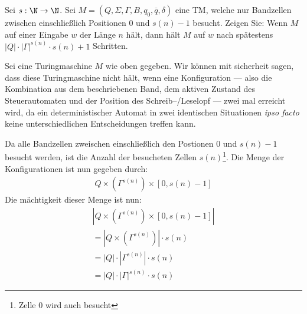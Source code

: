 \documentclass[listings, a4paper, 11pt]{homeworkassignment}
\date{\today}
\author{
  Georg Dorndorf\\
  Adrian Hinrichs}
\newcommand{\task}[1]{
  \begin{framed}
    \keyword{Problem:} #1
  \end{framed}
}
\newcommand*\card[1]{\left|#1\right|}
\begin{document}
\maketitle
\makeGradingTable[14]

\task{Sei \(s: \N \rightarrow \N\). Sei \(M= (Q,Σ,Γ,B,q_0,\overline{q},δ)\)
eine TM, welche nur Bandzellen zwischen einschließlich Positionen 0
und \(s(n)−1\) besucht. Zeigen Sie: Wenn \(M\) auf einer Eingabe \(w\)
der Länge \(n\) hält, dann hält \(M\) auf \(w\) nach spätestens
\(\card{Q}\cdot\card{\Gamma}^{s(n)}\cdot s(n)+1\) Schritten.} 
\proof Sei eine Turingmaschine \(M\) wie oben gegeben.  Wir können mit
sicherheit sagen, dass diese Turingmaschine nicht hält, wenn eine
Konfiguration --- also die Kombination aus dem beschriebenen Band, dem
aktiven Zustand des Steuerautomaten und der Position des
Schreib--/Leselopf --- zwei mal erreicht wird, da ein
deterministischer Automat in zwei identischen Situationen \emph{ipso
  facto} keine unterschiedlichen Entscheidungen treffen kann.

Da alle Bandzellen zweischen einschließlich den Postionen 0 und
\(s(n)-1\) besucht werden, ist die Anzahl der besucheten Zellen
\(s(n)\)\footnote{Zelle 0 wird auch besucht}. Die Menge der
Konfigurationen ist nun gegeben durch:
\begin{gather*}
  Q\times(\Gamma^{s(n)})\times[0,s(n)-1]
\end{gather*}
Die mächtigkeit dieser Menge ist nun:
\begin{gather*}
  \card{Q\times(\Gamma^{s(n)})\times[0,s(n)-1]}\\
  =\card{Q\times(\Gamma^{s(n)})}\cdot
  s(n)\\
  =\card{Q}\cdot\card{\Gamma^{s(n)}}\cdot
  s(n)\\
  = \card{Q} \cdot \card{\Gamma}^{s(n)} \cdot s(n)
\end{gather*}
\end{document}
